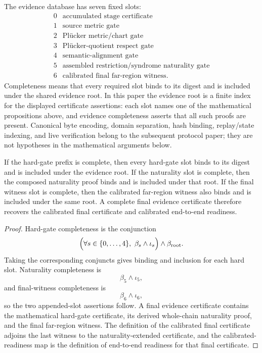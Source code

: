 The evidence database has seven fixed slots:
\[
\begin{array}{c|l}
0 & \text{accumulated stage certificate}\\
1 & \text{source metric gate}\\
2 & \text{Pl\"ucker metric/chart gate}\\
3 & \text{Pl\"ucker-quotient respect gate}\\
4 & \text{semantic-alignment gate}\\
5 & \text{assembled restriction/syndrome naturality gate}\\
6 & \text{calibrated final far-region witness}.
\end{array}
\]
Completeness means that every required slot binds to its digest and is included
under the shared evidence root. In this paper the evidence root is a finite
index for the displayed certificate assertions: each slot names one of the
mathematical propositions above, and evidence completeness asserts that all
such proofs are present. Canonical byte encoding, domain
separation, hash binding, replay/state indexing, and live verification belong
to the subsequent protocol paper; they are not hypotheses in the mathematical
arguments below.

\begin{proposition}\label{prop:evidence-completeness}
If the hard-gate prefix is complete, then every hard-gate slot binds to its
digest and is included under the evidence root. If the naturality slot is
complete, then the composed naturality proof binds and is included under that
root. If the final witness slot is complete, then the calibrated far-region
witness also binds and is included under the same root. A complete final
evidence certificate therefore recovers the calibrated final certificate and
calibrated end-to-end readiness.
\end{proposition}

\begin{proof}
Hard-gate completeness is the conjunction
\[
  \Bigl(\forall s\in\{0,\ldots,4\},\
    \beta_s\wedge\iota_s\Bigr)
  \wedge
  \beta_{\mathrm{root}}.
\]
Taking the corresponding conjuncts gives binding and inclusion for each hard
slot. Naturality completeness is
\[
  \beta_5\wedge\iota_5,
\]
and final-witness completeness is
\[
  \beta_6\wedge\iota_6,
\]
so the two appended-slot assertions follow. A final evidence certificate
contains the mathematical hard-gate certificate, its derived whole-chain
naturality proof, and the final far-region witness. The definition of the
calibrated final certificate adjoins the last witness to the
naturality-extended certificate, and the calibrated-readiness map is the
definition of end-to-end readiness for that final certificate.
\end{proof}

